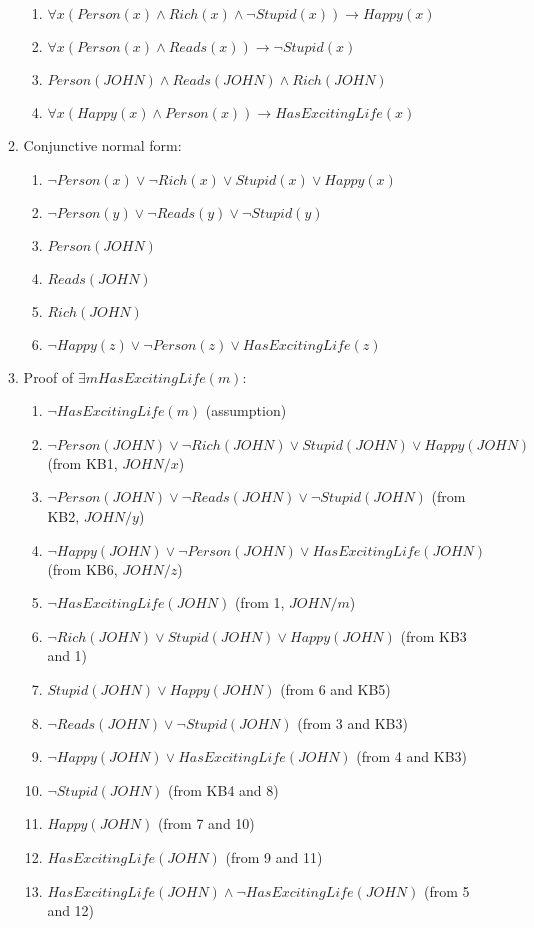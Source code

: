 \documentclass[11pt]{article}
\begin{document}
\begin{enumerate}[label=\bfseries Question \arabic*:]
\begin{enumerate}
\begin{enumerate}[label=\arabic*.]
    \item\(\forall x (Person(x) \land Rich(x) \land \lnot Stupid(x))
      \rightarrow Happy(x)\)
    \item
      \( \forall x (Person(x) \land Reads(x)) \rightarrow \lnot
      Stupid(x) \)
    \item \(Person(JOHN) \land Reads(JOHN) \land Rich(JOHN) \)
    \item
      \(\forall x (Happy(x) \land Person(x)) \rightarrow
      HasExcitingLife(x) \)
    \end{enumerate}
  \item Conjunctive normal form:
    \begin{enumerate}[label=KB\arabic*.]
    \item
      \(\lnot Person(x) \lor \lnot Rich(x) \lor Stupid(x) \lor
      Happy(x)\)
    \item \(\lnot Person(y) \lor \lnot Reads(y) \lor \lnot Stupid(y)\)
    \item \(Person(JOHN)\)
    \item \(Reads(JOHN)\)
    \item \(Rich(JOHN)\)
    \item
      \(\lnot Happy(z) \lor \lnot Person(z) \lor HasExcitingLife(z)\)
    \end{enumerate}
\item Proof of \(\exists m HasExcitingLife(m)\):
  \begin{enumerate}[label=\arabic*.]
  \item \( \lnot HasExcitingLife(m)\) (assumption)
  \item
    \(\lnot Person(JOHN) \lor \lnot Rich(JOHN) \lor Stupid(JOHN) \lor
    Happy(JOHN)\) (from KB1, \(JOHN / x\))
  \item
    \(\lnot Person(JOHN) \lor \lnot Reads(JOHN) \lor \lnot
    Stupid(JOHN)\) (from KB2, \(JOHN / y\))
  \item
    \(\lnot Happy(JOHN) \lor \lnot Person(JOHN) \lor
    HasExcitingLife(JOHN)\) (from KB6, \(JOHN /z\))
  \item \( \lnot HasExcitingLife(JOHN)\) (from 1, \(JOHN / m\))
  \item \(\lnot Rich(JOHN) \lor Stupid(JOHN) \lor Happy(JOHN)\)
    (from KB3 and 1)
  \item \(Stupid(JOHN) \lor Happy(JOHN)\) (from 6 and KB5)
  \item \(\lnot Reads(JOHN) \lor \lnot Stupid(JOHN)\) (from 3 and KB3)
  \item \(\lnot Happy(JOHN) \lor HasExcitingLife(JOHN)\)
    (from 4 and KB3)
  \item \(\lnot Stupid(JOHN)\) (from KB4 and 8)
  \item \(Happy(JOHN)\) (from 7 and 10)
  \item \(HasExcitingLife(JOHN)\) (from 9 and 11)
  \item \(HasExcitingLife(JOHN) \land \lnot HasExcitingLife(JOHN)\)
    (from 5 and 12)
 
  \end{enumerate}
  \end{enumerate}
\end{enumerate}
\end{document}
